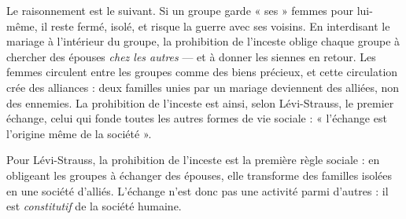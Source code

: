 \documentclass[11pt]{article}
\newcommand{\cle}[1]{{\popxbold\color{popdark}#1}}
\begin{document}
Le raisonnement est le suivant. Si un groupe garde « ses » femmes pour lui-même, il reste fermé, isolé, et risque la guerre avec ses voisins. En interdisant le mariage à l'intérieur du groupe, la prohibition de l'inceste oblige chaque groupe à chercher des épouses \emph{chez les autres} — et à donner les siennes en retour. Les femmes circulent entre les groupes comme des biens précieux, et cette circulation crée des alliances : deux familles unies par un mariage deviennent des alliées, non des ennemies. La prohibition de l'inceste est ainsi, selon Lévi-Strauss, le \cle{premier échange}, celui qui fonde toutes les autres formes de vie sociale : « l'échange est l'origine même de la société ».

\begin{aretenir}
Pour Lévi-Strauss, la prohibition de l'inceste est la première règle sociale : en obligeant les groupes à échanger des épouses, elle transforme des familles isolées en une société d'alliés. L'échange n'est donc pas une activité parmi d'autres : il est \emph{constitutif} de la société humaine.
\end{aretenir}
\end{document}
